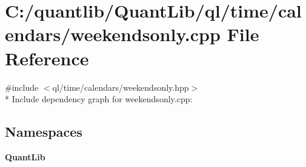 \section{C\+:/quantlib/\+Quant\+Lib/ql/time/calendars/weekendsonly.cpp File Reference}
\label{weekendsonly_8cpp}
{\ttfamily \#include $<$ql/time/calendars/weekendsonly.\+hpp$>$}\\*
Include dependency graph for weekendsonly.\+cpp\+:
\subsection*{Namespaces}
\begin{DoxyCompactItemize}
\item 
 {\bf Quant\+Lib}
\end{DoxyCompactItemize}
